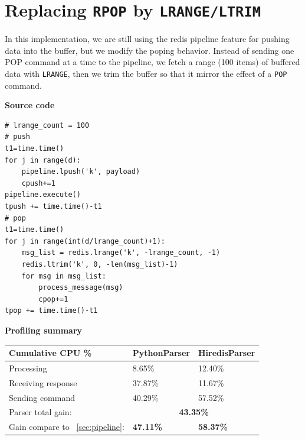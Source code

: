 \documentclass[a4paper, 11pt]{report}
\begin{document}
\newpage
\section{Replacing \texttt{RPOP} by \texttt{LRANGE/LTRIM}\label{sec:lrange}}
In this implementation, we are still using the redis pipeline feature for pushing data into the buffer, but we modify the poping behavior.
Instead of sending one POP command at a time to the pipeline, we fetch a range (100 items) of buffered data with \texttt{LRANGE}, then we trim the buffer so that it mirror the effect of a \texttt{POP} command.\\

\begin{minipage}[t]{0.45\textwidth}
\textbf{Source code}\\
\vspace{-0.5em}
\begin{lstlisting}
# lrange_count = 100
# push
t1=time.time()
for j in range(d):
    pipeline.lpush('k', payload)
    cpush+=1
pipeline.execute()
tpush += time.time()-t1
# pop
t1=time.time()
for j in range(int(d/lrange_count)+1):
    msg_list = redis.lrange('k', -lrange_count, -1)
    redis.ltrim('k', 0, -len(msg_list)-1)
    for msg in msg_list:
        process_message(msg)
        cpop+=1
tpop += time.time()-t1
\end{lstlisting}
\end{minipage}
\quad
\begin{minipage}[t]{0.5\textwidth}
\textbf{Profiling summary}\\

    \begin{tabular}{|l|l|l|}
        \hline
        Cumulative CPU \% & PythonParser & HiredisParser\\
        \hline
        Processing & 8.65\% & 12.40\%\\
        \hline
        Receiving response & 37.87\% & 11.67\%\\
        \hline
        Sending command & 40.29\% & 57.52\%\\
        \hline
        Parser total gain: & \multicolumn{2}{c|}{\textbf{43.35\%}}\\
        \hline
        Gain compare to ~\ref{sec:pipeline}: & \textbf{47.11\%} & \textbf{58.37\%}\\
        \hline
    \end{tabular}
\end{minipage}
\end{document}
